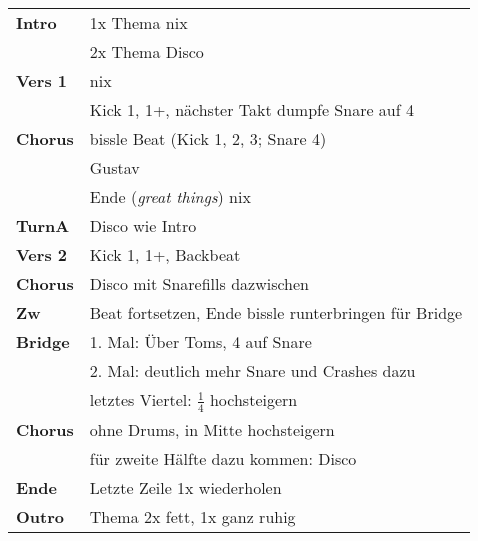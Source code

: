 
\begin{tabular}{p{1.6cm}l}
	\textbf{Intro}  & 1x Thema nix                                          \\
	                & 2x Thema Disco                                        \\
	\textbf{Vers 1} & nix                                                   \\
	                & Kick 1, 1+, nächster Takt dumpfe Snare auf 4          \\
	\textbf{Chorus} & bissle Beat (Kick 1, 2, 3; Snare 4)                   \\
	                & Gustav                                                \\
	                & Ende (\textit{great things}) nix                      \\
	\textbf{TurnA}  & Disco wie Intro                                       \\
	\textbf{Vers 2} & Kick 1, 1+, Backbeat                                  \\
	\textbf{Chorus} & Disco mit Snarefills dazwischen                       \\
	\textbf{Zw}     & Beat fortsetzen, Ende bissle runterbringen für Bridge \\
	\textbf{Bridge} & 1. Mal: Über Toms, 4 auf Snare                        \\
	                & 2. Mal: deutlich mehr Snare und Crashes dazu          \\
	                & letztes Viertel: $\frac{1}{4}$ hochsteigern           \\
	\textbf{Chorus} & ohne Drums, in Mitte hochsteigern                     \\
	                & für zweite Hälfte dazu kommen: Disco                  \\
	\textbf{Ende}   & Letzte Zeile 1x wiederholen                           \\
	\textbf{Outro}  & Thema 2x fett, 1x ganz ruhig                          \\
\end{tabular}
